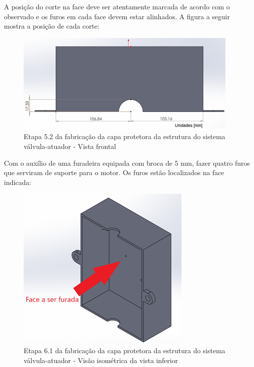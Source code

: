 A posição do corte na face deve ser atentamente marcada de acordo com o observado e os furos em cada face devem estar alinhados. A figura a seguir mostra a posição de cada corte:
\begin{figure} [H]
    \centering
    \includegraphics[width=.7\textwidth]{Figuras/montagemAbastecimento/capa/etapa5_2.png}
    \caption{Etapa 5.2 da fabricação da capa protetora da estrutura do sistema válvula-atuador - Vista frontal}
    \label{fig:etapa5.2}
\end{figure}

Com o auxílio de uma furadeira equipada com broca de 5 mm, fazer quatro furos que serviram de suporte para o motor. Os furos estão localizados na face indicada:

\begin{figure} [H]
    \centering
    \includegraphics[width=.5\textwidth]{Figuras/montagemAbastecimento/capa/etapa6_1.png}
    \caption{Etapa 6.1 da fabricação da capa protetora da estrutura do sistema válvula-atuador - Visão isométrica da vista inferior}
    \label{fig:etapa6.1}
\end{figure}

